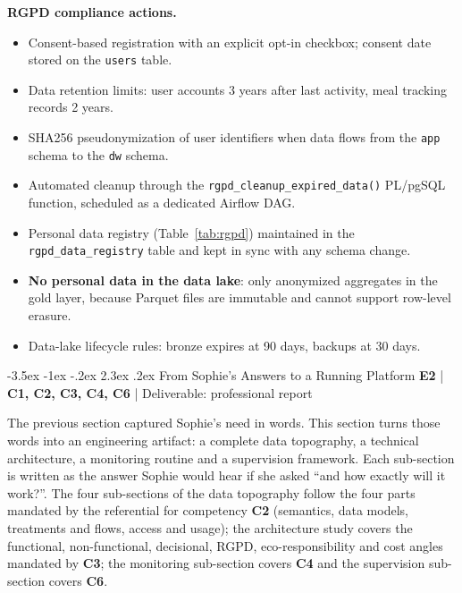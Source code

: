 \documentclass[a4paper,11pt,oneside,openany]{report}
\makeatletter
\renewcommand\section{\@startsection{section}{1}{\z@}%
  {-3.5ex \@plus -1ex \@minus -.2ex}%
  {2.3ex \@plus.2ex}%
  {\normalfont\Large\bfseries\color{ntgreen}}}
\newcommand{\competence}[1]{\textbf{\textcolor{ntgreen}{#1}}}
\newcommand{\evaluation}[1]{\textbf{\textcolor{ntblue}{#1}}}
\newcommand{\rgpd}{RGPD}
\makeatother
\begin{document}
\textbf{\rgpd{} compliance actions.}
\begin{itemize}[nosep]
  \item Consent-based registration with an explicit opt-in
        checkbox; consent date stored on the \texttt{users} table.
  \item Data retention limits: user accounts 3 years after last
        activity, meal tracking records 2 years.
  \item SHA256 pseudonymization of user identifiers when data
        flows from the \texttt{app} schema to the \texttt{dw}
        schema.
  \item Automated cleanup through the
        \texttt{rgpd\_cleanup\_expired\_data()} PL/pgSQL function,
        scheduled as a dedicated Airflow DAG.
  \item Personal data registry (Table~\ref{tab:rgpd}) maintained
        in the \texttt{rgpd\_data\_registry} table and kept in
        sync with any schema change.
  \item \textbf{No personal data in the data lake}: only
        anonymized aggregates in the gold layer, because Parquet
        files are immutable and cannot support row-level erasure.
  \item Data-lake lifecycle rules: bronze expires at 90 days,
        backups at 30 days.
\end{itemize}


\section{From Sophie's Answers to a Running Platform}
\label{sec:e2}
{\small\evaluation{E2} | \competence{C1, C2, C3, C4, C6} |
Deliverable: professional report}

The previous section captured Sophie's need in words. This section
turns those words into an engineering artifact: a complete data
topography, a technical architecture, a monitoring routine and a
supervision framework. Each sub-section is written as the answer
Sophie would hear if she asked ``and how exactly will it work?''.
The four sub-sections of the data topography follow the four parts
mandated by the referential for competency \competence{C2}
(semantics, data models, treatments and flows, access and usage);
the architecture study covers the functional, non-functional,
decisional, \rgpd{}, eco-responsibility and cost angles mandated
by \competence{C3}; the monitoring sub-section covers \competence{C4}
and the supervision sub-section covers \competence{C6}.
\end{document}
